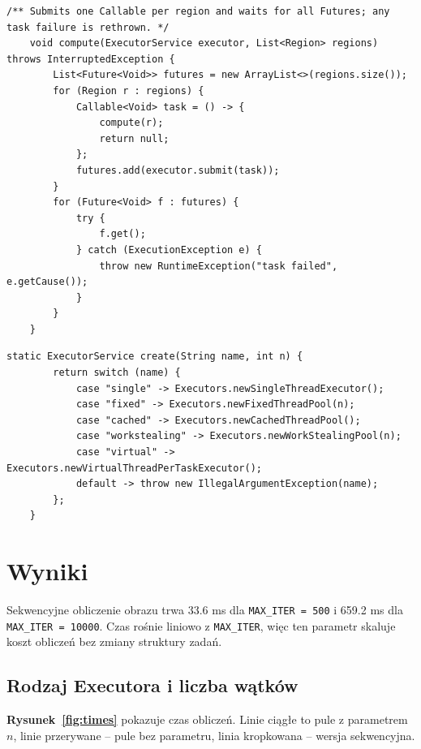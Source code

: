 \documentclass[11pt,a4paper]{article}
\begin{document}
\begin{lstlisting}[caption={Metoda \texttt{compute} klasy \textbf{Mandelbrot}: zgłoszenie zadań do Executora i oczekiwanie na Future (\texttt{src/Mandelbrot.java})}]
    /** Submits one Callable per region and waits for all Futures; any task failure is rethrown. */
    void compute(ExecutorService executor, List<Region> regions) throws InterruptedException {
        List<Future<Void>> futures = new ArrayList<>(regions.size());
        for (Region r : regions) {
            Callable<Void> task = () -> {
                compute(r);
                return null;
            };
            futures.add(executor.submit(task));
        }
        for (Future<Void> f : futures) {
            try {
                f.get();
            } catch (ExecutionException e) {
                throw new RuntimeException("task failed", e.getCause());
            }
        }
    }
\end{lstlisting}

\begin{lstlisting}[caption={Fabryka puli (\texttt{src/Executors2.java})}]
    static ExecutorService create(String name, int n) {
        return switch (name) {
            case "single" -> Executors.newSingleThreadExecutor();
            case "fixed" -> Executors.newFixedThreadPool(n);
            case "cached" -> Executors.newCachedThreadPool();
            case "workstealing" -> Executors.newWorkStealingPool(n);
            case "virtual" -> Executors.newVirtualThreadPerTaskExecutor();
            default -> throw new IllegalArgumentException(name);
        };
    }
\end{lstlisting}


\section{Wyniki}
Sekwencyjne obliczenie obrazu trwa \num{33.6} ms dla \texttt{MAX\_ITER = 500} i \num{659.2} ms dla \texttt{MAX\_ITER = 10000}.
Czas rośnie liniowo z \texttt{MAX\_ITER}, więc ten parametr skaluje koszt obliczeń bez zmiany struktury zadań.

\subsection{Rodzaj Executora i liczba wątków}
\textbf{Rysunek~\ref{fig:times}} pokazuje czas obliczeń. Linie ciągłe to pule z parametrem $n$,
linie przerywane -- pule bez parametru, linia kropkowana -- wersja sekwencyjna.
\end{document}

